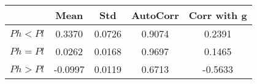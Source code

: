 \begin{tiny}\begin{tabular}{|l|c|c|c|c|}
\hline
&\textbf{Mean}&\textbf{Std}&\textbf{AutoCorr}&\textbf{Corr with g}\\\hline
\textbf{$Ph<Pl$}&0.3370&0.0726&0.9074&0.2391\\\hline
\textbf{$Ph=Pl$}&0.0262&0.0168&0.9697&0.1465\\\hline
\textbf{$Ph>Pl$}&-0.0997&0.0119&0.6713&-0.5633\\\hline
\end{tabular}
\end{tiny}